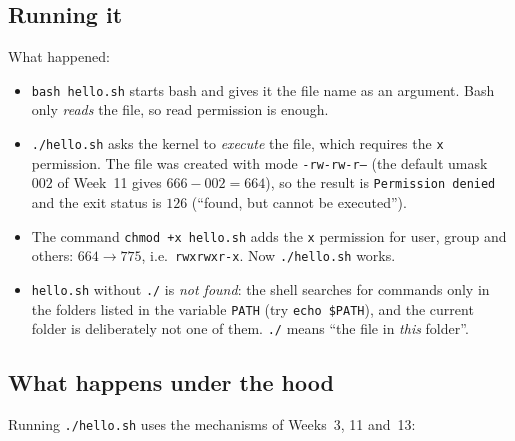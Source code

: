 \documentclass[11pt,a4paper]{article}
\newcommand{\cmd}[1]{\texttt{#1}}
\begin{document}
\subsection{Running it}
\label{sec:running}



What happened:
\begin{itemize}
  \item \cmd{bash hello.sh} starts bash and gives it the file name as an argument. Bash only \emph{reads} the file, so read permission is enough.
  \item \cmd{./hello.sh} asks the kernel to \emph{execute} the file, which requires the \texttt{x} permission. The file was created with mode \texttt{-rw-rw-r--} (the default umask $002$ of Week~11 gives $666 - 002 = 664$), so the result is \texttt{Permission denied} and the exit status is $126$ (“found, but cannot be executed”).
  \item The command \cmd{chmod +x hello.sh} adds the \texttt{x} permission for user, group and others: $664 \to 775$, i.e.\ \texttt{rwxrwxr-x}. Now \texttt{./hello.sh} works.
  \item \cmd{hello.sh} without \texttt{./} is \emph{not found}: the shell searches for commands only in the folders listed in the variable \texttt{PATH} (try \cmd{echo \$PATH}), and the current folder is deliberately not one of them. \texttt{./} means “the file in \emph{this} folder”.
\end{itemize}

\subsection{What happens under the hood}

Running \texttt{./hello.sh} uses the mechanisms of Weeks~3, 11 and~13:
\end{document}
